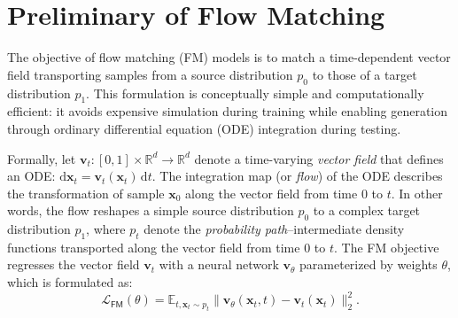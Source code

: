 \section{Preliminary of Flow Matching}
\label{sec:preliminary}

The objective of flow matching (FM) models is to match a time-dependent vector field transporting samples from a source distribution $p_0$ to those of a target distribution $p_1$.  This formulation is conceptually simple and computationally efficient: it avoids expensive simulation during training while enabling generation through ordinary differential equation (ODE) integration during testing.

Formally, let $\bm{v}_t: [0, 1] \times \mathbb{R}^d    \rightarrow \mathbb{R}^d$ denote a time-varying \textit{vector field} that defines an ODE: $\mathrm{d}\bm{x}_t = \bm{v}_t(\bm{x}_t) \, \mathrm{d}t$.  The integration map (or \textit{flow}) of the ODE describes the transformation of sample $\bm{x}_0$ along the vector field from time $0$ to $t$.  In other words, the flow reshapes a simple source distribution $p_0$ to a complex target distribution $p_1$, where $p_t$ denote the \textit{probability path}--intermediate density functions transported along the vector field from time $0$ to $t$.  The FM objective regresses the vector field $\bm{v}_t$ with a neural network $\bm{v}_\theta$ parameterized by weights $\theta$, which is formulated as:
\begin{equation}
    \mathcal{L}_\textsf{FM}(\theta) = \mathbb{E}_{t, \bm{x}_t \sim p_t} \|\bm{v}_\theta(\bm{x}_t, t) - \bm{v}_t(\bm{x}_t)\|_2^2.
\end{equation}


